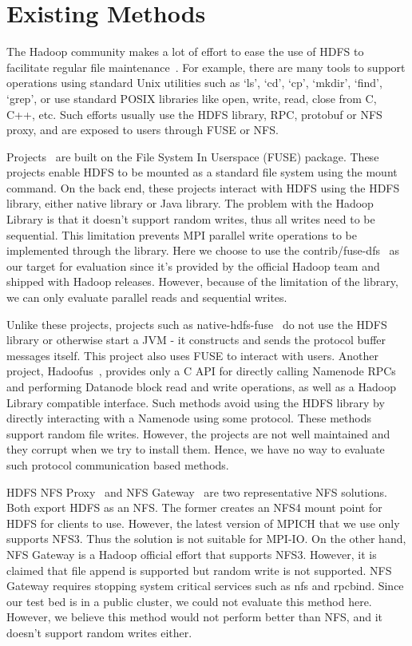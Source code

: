 \section{Existing Methods}
\label{sec:bg}
The Hadoop community makes a lot of effort to ease the use of HDFS to
facilitate regular file maintenance~\cite{fuse}. For example, there are many tools to support
operations using standard Unix
utilities such as `ls', `cd', `cp', `mkdir', `find', `grep', or use standard
POSIX libraries like open, write, read, close from C, C++, etc. Such efforts
usually use the HDFS library, RPC, protobuf or NFS proxy, and are exposed to users
through FUSE or NFS.

Projects~\cite{fuse, hdfs-fuse, fuse-j} are built on the File System In Userspace (FUSE) package. These projects enable
HDFS to be mounted as a standard file system using the mount command. On the
back end, these projects interact with HDFS using the HDFS library, either native
library or Java library. The problem with the Hadoop Library is that it doesn't
support random writes, thus all writes need to be sequential. This limitation
prevents MPI parallel write operations to be implemented through the library.
Here we choose
to use the contrib/fuse-dfs~\cite{fuse} as our target for evaluation since it's
provided by the official Hadoop team and shipped with Hadoop releases. However,
because of the limitation of the library, we can only evaluate parallel reads and
sequential writes.

Unlike
these projects, projects such as native-hdfs-fuse~\cite{native} do not use the
HDFS library or otherwise start a JVM - it constructs and sends the protocol buffer
messages itself. This project also uses FUSE to interact with users. Another
project, Hadoofus~\cite{hadoofus}, provides only a C
API for directly calling Namenode RPCs and performing Datanode block read and
write operations, as well as a Hadoop Library compatible interface. Such methods
avoid using the HDFS library by directly interacting with a Namenode using some
protocol. These methods support random file writes. However, the projects are
not well maintained and they corrupt when we try to install them. Hence, we have
no way to evaluate such protocol communication based methods.

HDFS NFS Proxy~\cite{proxy} and NFS Gateway~\cite{nfs} are two representative
NFS solutions. Both export HDFS as an NFS. The former creates an NFS4 mount point
for HDFS for clients to use. However, the latest version of MPICH that
we use only supports NFS3. Thus the solution is not suitable for MPI-IO. On the
other hand, NFS Gateway is a Hadoop official effort that supports NFS3. However,
it is claimed that file append is supported but random write is not supported.
NFS Gateway requires stopping system
critical services such as nfs and rpcbind. Since our test bed is in a public
cluster, we could not evaluate this method here. However, we believe this method would
not perform better than NFS, and it doesn't support random writes either.

